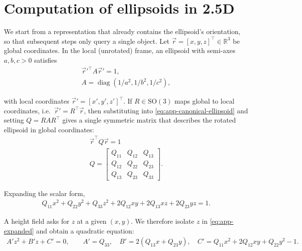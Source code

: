 \resetgraphicspath
{}


\chapter{Computation of ellipsoids in 2.5D}
\label{app:ellipsoid-matrix}


We start from a representation that already contains the ellipsoid's orientation, so that subsequent steps only query a single object. Let $\vec r=[x,y,z]^\top \in\mathbb{R}^3$ be global coordinates. In the local (unrotated) frame, an ellipsoid with semi-axes $a,b,c>0$ satisfies
\begin{align}
    \label{eq:app-canonical-ellipsoid}
    \vec r'^\top  A \vec r' = 1, \\
    A=\operatorname{diag}\!\left(1/a^2, 1/b^2, 1/c^2\right),
\end{align}

with local coordinates $\vec r'=[x',y',z']^\top $. If $R\in \mathrm{SO}(3)$ maps global to local coordinates, i.e.\ $\vec r'=R^\top \vec r$, then substituting into \cref{eq:app-canonical-ellipsoid} and setting $Q=RAR^\top $ gives a single symmetric matrix that describes the rotated ellipsoid in global coordinates:
\begin{align}
    \label{eq:app-global-implicit}
    \vec r^\top  Q \vec r = 1 \\
    Q =
    \begin{bmatrix}
        Q_{11} & Q_{12} & Q_{13}\\
        Q_{12} & Q_{22} & Q_{23}\\
        Q_{13} & Q_{23} & Q_{33}
    \end{bmatrix}.
\end{align}

Expanding the scalar form,
\begin{align}
    \label{eq:app-expanded}
    Q_{11}x^2 + Q_{22}y^2 + Q_{33}z^2 + 2Q_{12}xy + 2Q_{13}xz + 2Q_{23}yz = 1.
\end{align}

A height field asks for $z$ at a given $(x,y)$. We therefore isolate $z$ in \cref{eq:app-expanded} and obtain a quadratic equation:
\begin{align}
    \label{eq:app-quadratic-coeffs}
    A' z^2 + B' z + C' = 0,
    \qquad
    A' = Q_{33},\quad
    B' = 2(Q_{13}x + Q_{23}y),\quad
    C' = Q_{11}x^2 + 2Q_{12}xy + Q_{22}y^2 - 1.
\end{align}

